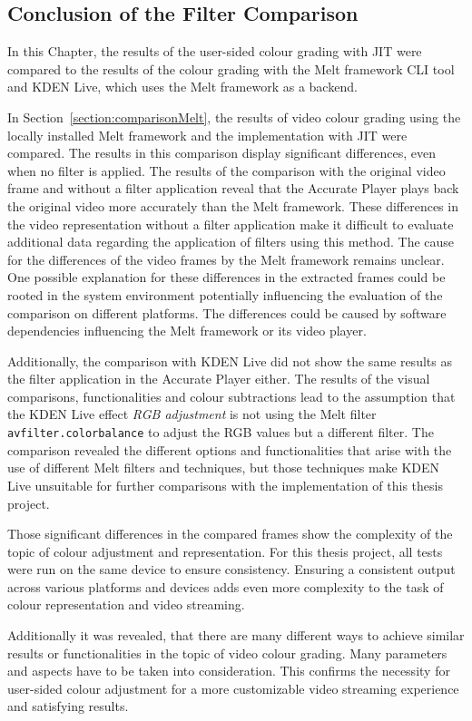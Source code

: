 \documentclass[../MasterThesis.tex]{subfiles}
\begin{document}


\subsection{Conclusion of the Filter Comparison} \label{section:resultscomparisons}


In this Chapter, the results of the user-sided colour grading with JIT were compared to the results of the colour grading with the Melt framework CLI tool and KDEN Live, which uses the Melt framework as a backend.

In Section~\ref{section:comparisonMelt}, the results of video colour grading using the locally installed Melt framework and the implementation with JIT were compared. 
The results in this comparison display significant differences, even when no filter is applied. 
The results of the comparison with the original video frame and without a filter application reveal that the Accurate Player plays back the original video more accurately than the Melt framework.
These differences in the video representation without a filter application make it difficult to evaluate additional data regarding the application of filters using this method. The cause for the differences of the video frames by the Melt framework remains unclear.
One possible explanation for these differences in the extracted frames could be rooted in the system environment potentially influencing the evaluation of the comparison on different platforms. The differences could be caused by software dependencies influencing the Melt framework or its video player.



Additionally, the comparison with KDEN Live did not show the same results as the filter application in the Accurate Player either. The results of the visual comparisons, functionalities and colour subtractions lead to the assumption that the KDEN Live effect \textit{RGB adjustment} is not using the Melt filter \texttt{avfilter.colorbalance} to adjust the RGB values but a different filter.
The comparison revealed the different options and functionalities that arise with the use of different Melt filters and techniques, but those techniques make KDEN Live unsuitable for further comparisons with the implementation of this thesis project.


Those significant differences in the compared frames show the complexity of the topic of colour adjustment and representation. 
For this thesis project, all tests were run on the same device to ensure consistency. 
Ensuring a consistent output across various platforms and devices adds even more complexity to the task of colour representation and video streaming.


Additionally it was revealed, that there are many different ways to achieve similar results or functionalities in the topic of video colour grading. Many parameters and aspects have to be taken into consideration. This confirms the necessity for user-sided colour adjustment for a more customizable video streaming experience and satisfying results. 
	
	
	
\end{document}
